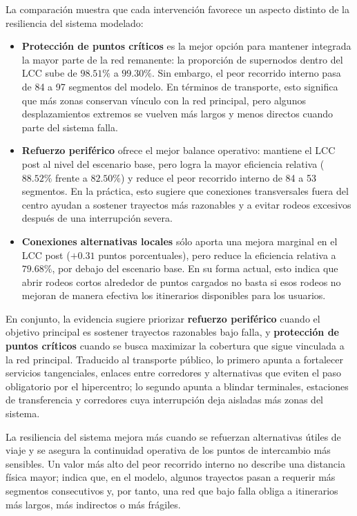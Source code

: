             La comparación muestra que cada intervención favorece un aspecto distinto de la resiliencia del sistema modelado:
            \begin{itemize}
                \item \textbf{Protección de puntos críticos} es la mejor opción para mantener integrada la mayor parte de la red remanente: la proporción de supernodos dentro del LCC sube de \(98.51\%\) a \(99.30\%\). Sin embargo, el peor recorrido interno pasa de 84 a 97 segmentos del modelo. En términos de transporte, esto significa que más zonas conservan vínculo con la red principal, pero algunos desplazamientos extremos se vuelven más largos y menos directos cuando parte del sistema falla.
                \item \textbf{Refuerzo periférico} ofrece el mejor balance operativo: mantiene el LCC post al nivel del escenario base, pero logra la mayor eficiencia relativa (\(88.52\%\) frente a \(82.50\%\)) y reduce el peor recorrido interno de 84 a 53 segmentos. En la práctica, esto sugiere que conexiones transversales fuera del centro ayudan a sostener trayectos más razonables y a evitar rodeos excesivos después de una interrupción severa.
                \item \textbf{Conexiones alternativas locales} sólo aporta una mejora marginal en el LCC post (\(+0.31\) puntos porcentuales), pero reduce la eficiencia relativa a \(79.68\%\), por debajo del escenario base. En su forma actual, esto indica que abrir rodeos cortos alrededor de puntos cargados no basta si esos rodeos no mejoran de manera efectiva los itinerarios disponibles para los usuarios.
            \end{itemize}
            En conjunto, la evidencia sugiere priorizar \textbf{refuerzo periférico} cuando el objetivo principal es sostener trayectos razonables bajo falla, y \textbf{protección de puntos críticos} cuando se busca maximizar la cobertura que sigue vinculada a la red principal. Traducido al transporte público, lo primero apunta a fortalecer servicios tangenciales, enlaces entre corredores y alternativas que eviten el paso obligatorio por el hipercentro; lo segundo apunta a blindar terminales, estaciones de transferencia y corredores cuya interrupción deja aisladas más zonas del sistema.

            La resiliencia del sistema mejora más cuando se refuerzan alternativas útiles de viaje y se asegura la continuidad operativa de los puntos de intercambio más sensibles. Un valor más alto del peor recorrido interno no describe una distancia física mayor; indica que, en el modelo, algunos trayectos pasan a requerir más segmentos consecutivos y, por tanto, una red que bajo falla obliga a itinerarios más largos, más indirectos o más frágiles.


